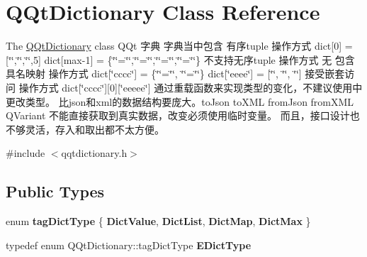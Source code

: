 \hypertarget{class_q_qt_dictionary}{}\section{Q\+Qt\+Dictionary Class Reference}
\label{class_q_qt_dictionary}


The \mbox{\hyperlink{class_q_qt_dictionary}{Q\+Qt\+Dictionary}} class Q\+Qt 字典 字典当中包含 有序tuple 操作方式 dict\mbox{[}0\mbox{]} = \mbox{[}\char`\"{}\char`\"{},\char`\"{}\char`\"{},\char`\"{}\char`\"{},5\mbox{]} dict\mbox{[}max-\/1\mbox{]} = \{\char`\"{}\char`\"{}=\char`\"{}\char`\"{},\char`\"{}\char`\"{}=\char`\"{}\char`\"{},\char`\"{}\char`\"{}=\char`\"{}\char`\"{},\char`\"{}\char`\"{}=\char`\"{}\char`\"{}\} 不支持无序tuple 操作方式 无 包含具名映射 操作方式 dict\mbox{[}\char`\"{}cccc\char`\"{}\mbox{]} = \{\char`\"{}\char`\"{}=\char`\"{}\char`\"{}, \char`\"{}\char`\"{}=\char`\"{}\char`\"{}\} dict\mbox{[}\char`\"{}eeee\char`\"{}\mbox{]} = \mbox{[}\char`\"{}\char`\"{}, \char`\"{}\char`\"{}, \char`\"{}\char`\"{}\mbox{]} 接受嵌套访问 操作方式 dict\mbox{[}\char`\"{}cccc\char`\"{}\mbox{]}\mbox{[}0\mbox{]}\mbox{[}\char`\"{}eeeee\char`\"{}\mbox{]} 通过重载函数来实现类型的变化，不建议使用中更改类型。 比json和xml的数据结构要庞大。to\+Json to\+X\+ML from\+Json from\+X\+ML Q\+Variant 不能直接获取到真实数据，改变必须使用临时变量。 而且，接口设计也不够灵活，存入和取出都不太方便。  




{\ttfamily \#include $<$qqtdictionary.\+h$>$}

\subsection*{Public Types}
\begin{DoxyCompactItemize}
\item 
\mbox{\label{class_q_qt_dictionary_a09d6b632e2334a157207ae3dec35aa21}} 
enum {\bfseries tag\+Dict\+Type} \{ {\bfseries Dict\+Value}, 
{\bfseries Dict\+List}, 
{\bfseries Dict\+Map}, 
{\bfseries Dict\+Max}
 \}
\item 
\mbox{\label{class_q_qt_dictionary_a836ea52c0d7ec8c6fbbf0ffe19c0fcce}} 
typedef enum Q\+Qt\+Dictionary\+::tag\+Dict\+Type {\bfseries E\+Dict\+Type}
\end{DoxyCompactItemize}
